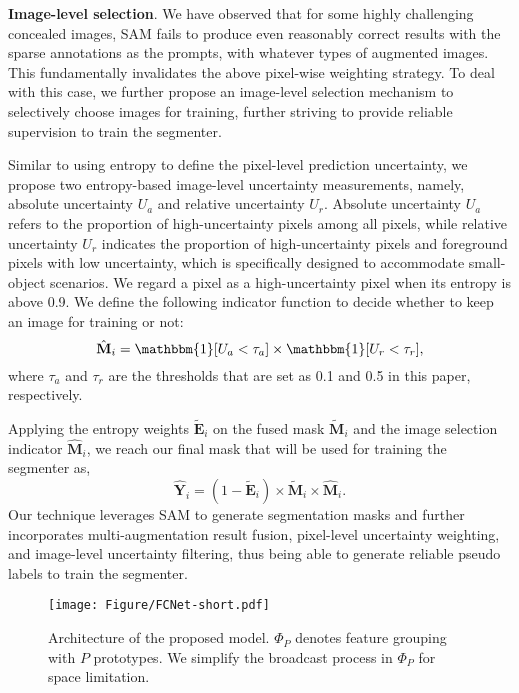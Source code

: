 \noindent\textbf{Image-level selection}. We have observed that for some highly challenging concealed images, SAM fails to produce even reasonably correct results with the sparse annotations as the prompts, with whatever types of augmented images. This fundamentally invalidates the above pixel-wise weighting strategy. To deal with this case, we further propose an image-level selection mechanism to selectively choose images for training, further striving to provide reliable supervision to train the segmenter.

Similar to using entropy to define the pixel-level prediction uncertainty, we propose two entropy-based image-level uncertainty measurements, namely, absolute uncertainty $U_a$ and relative uncertainty $U_r$. Absolute uncertainty $U_a$ refers to the proportion of high-uncertainty pixels among all pixels, while relative uncertainty $U_r$ indicates the proportion of high-uncertainty pixels and foreground pixels with low uncertainty, which is specifically designed to accommodate small-object scenarios. We regard a pixel as a high-uncertainty pixel when its entropy is above 0.9. We define the following indicator function to decide whether to keep an image for training or not:  
\begin{equation}
\hat{\mathbf{M}}_i = \mathbbm{1}[U_a < \tau_{a}] \times \mathbbm{1}[U_r < \tau_{r}],
\end{equation}
where $\tau_{a}$ and $\tau_{r}$ are the thresholds that are set as 0.1 and 0.5 in this paper, respectively.  

Applying the entropy weights $\tilde{\mathbf{E}}_i$  on the fused mask $\tilde{\mathbf{M}}_i$ and the image selection indicator $\hat{\mathbf{M}}_i$, we reach our final mask that will be used for training the segmenter as,
\begin{equation}
\hat{\mathbf{Y}}_i = (1 - \tilde{\mathbf{E}}_i) \times \tilde{\mathbf{M}}_i \times \hat{\mathbf{M}}_i.
\end{equation}
Our technique leverages SAM to generate segmentation masks and further incorporates multi-augmentation result fusion, pixel-level uncertainty weighting, and image-level uncertainty filtering, thus being able to generate reliable pseudo labels to train the segmenter.

\begin{figure}[t]
	\centering
	\setlength{\abovecaptionskip}{-0.2cm}
	\begin{center}
		\texttt{[image: Figure/FCNet-short.pdf]}
	\end{center}
 \vspace{0.5mm}
	\caption{Architecture of the proposed model. 
 $\Phi_P$ denotes feature grouping with $P$ prototypes. We simplify the broadcast process in $\Phi_P$ for space limitation.}
	\label{fig:MFG}
	\vspace{-0.6cm}
\end{figure}

